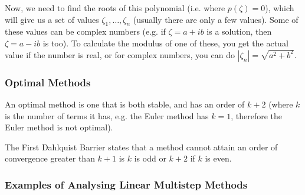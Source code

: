 Now, we need to find the roots of this polynomial (i.e. where
$p(\zeta) = 0$), which will give us a set of values
$\zeta_1,\dots,\zeta_n$ (usually there are only a few values). Some of
these values can be complex numbers (e.g. if $\zeta = a + ib$ is a
solution, then $\zeta = a - ib$ is too). To calculate the modulus of
one of these, you get the actual value if the number is real, or for
complex numbers, you can do $|\zeta_n| = \sqrt{a^2 + b^2}$.

\subsubsection{Optimal Methods}

An optimal method is one that is both stable, and has an order of $k +
2$ (where $k$ is the number of terms it has, e.g. the Euler method has
$k = 1$, therefore the Euler method is not optimal).

The First Dahlquist Barrier states that a method cannot attain an
order of convergence greater than $k + 1$ is $k$ is odd or $k + 2$ if
$k$ is even.

\subsubsection{Examples of Analysing Linear Multistep Methods}

